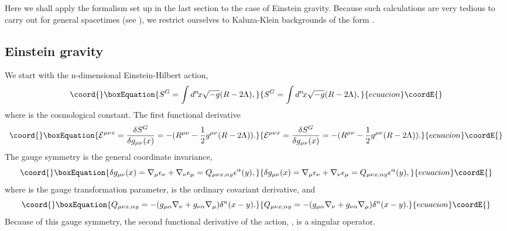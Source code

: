 \documentclass[a4paper,aps,preprint,groupedaddress,showpacs]{revtex4}
\begin{document}
Here we shall apply the formalism set up in the last section to
the case of Einstein gravity. Because such calculations are very tedious to
carry out for general spacetimes (see \cite{CK1}), we  restrict ourselves to
Kaluza-Klein backgrounds of the form \coordHE{}. 

\subsection{Einstein gravity}

We start with the n-dimensional Einstein-Hilbert action,
\begin{equation}\coord{}\boxEquation{
S^{G}=\int d^{n}\! x\sqrt{-g}(R-2\Lambda),
}{
S^{G}=\int d^{n}\! x\sqrt{-g}(R-2\Lambda),
}{ecuacion}\coordE{}\end{equation}
where \myHighlight{$\Lambda$}\coordHE{} is the cosmological constant. The first functional
derivative
\begin{equation}\coord{}\boxEquation{
{\cal E}^{\mu\nu x}=
\frac{\delta S^{G}}{\delta g_{\mu\nu}(x)}=
-(R^{\mu\nu}-\frac{1}{2}g^{\mu\nu}(R-2\Lambda)).
}{
{\cal E}^{\mu\nu x}=
\frac{\delta S^{G}}{\delta g_{\mu\nu}(x)}=
-(R^{\mu\nu}-\frac{1}{2}g^{\mu\nu}(R-2\Lambda)).
}{ecuacion}\coordE{}\end{equation}
The gauge symmetry is the general coordinate invariance,
\begin{equation}\coord{}\boxEquation{
\delta g_{\mu\nu}(x)=\nabla_{\mu}\epsilon_{\nu}+
\nabla_{\nu}\epsilon_{\mu}=
Q_{\mu\nu x, \alpha y}\epsilon^{\alpha}(y),
}{
\delta g_{\mu\nu}(x)=\nabla_{\mu}\epsilon_{\nu}+
\nabla_{\nu}\epsilon_{\mu}=
Q_{\mu\nu x, \alpha y}\epsilon^{\alpha}(y),
}{ecuacion}\coordE{}\end{equation}
where \coordHE{} is the gauge transformation parameter,  
\myHighlight{$\nabla_{\mu}$}\coordHE{} is the ordinary covariant derivative, and
\begin{equation}\coord{}\boxEquation{
Q_{\mu\nu x, \alpha y}=-(g_{\mu\alpha}\nabla_{\nu}+
g_{\nu\alpha}\nabla_{\mu})\delta^{n}(x-y).
}{
Q_{\mu\nu x, \alpha y}=-(g_{\mu\alpha}\nabla_{\nu}+
g_{\nu\alpha}\nabla_{\mu})\delta^{n}(x-y).
}{ecuacion}\coordE{}\end{equation}
Because of this gauge symmetry, the second functional derivative
of the action, \coordHE{}, is a singular operator.
\end{document}
